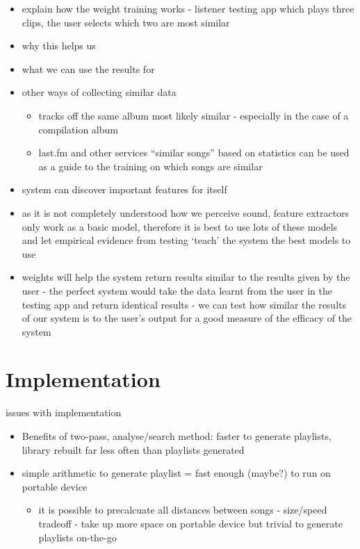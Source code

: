 \begin{itemize}
	\item explain how the weight training works - listener testing app which plays three clips, the user selects which two are most similar
	\item why this helps us
	\item what we can use the results for
	\item other ways of collecting similar data
	\begin{itemize}
		\item tracks off the same album most likely similar - especially in the case of a compilation album
		\item last.fm and other services ``similar songs'' based on statistics can be used as a guide to the training on which songs are similar
	\end{itemize}
\end{itemize}
\begin{itemize}
	\item system can discover important features for itself
	\item as it is not completely understood how we perceive sound, feature extractors only work as a basic model, therefore it is best to use lots of these models and let empirical evidence from testing `teach' the system the best models to use
	\item weights will help the system return results similar to the results given by the user - the perfect system would take the data learnt from the user in the testing app and return identical results - we can test how similar the results of our system is to the user's output for a good measure of the efficacy of the system
\end{itemize}
\section{Implementation}
issues with implementation
\begin{itemize}
	\item Benefits of two-pass, analyse/search method: faster to generate playlists, library rebuilt far less often than playlists generated
	\item simple arithmetic to generate playlist = fast enough (maybe?) to run on portable device
	\begin{itemize}
		\item it is possible to precalcuate all distances between songs - size/speed tradeoff - take up more space on portable device but trivial to generate playlists on-the-go
	\end{itemize}
\end{itemize}
